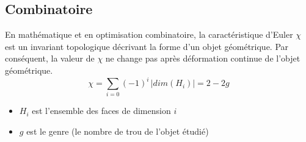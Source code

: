 \subsection{Combinatoire}
\noindent
En mathématique et en optimisation combinatoire, la caractéristique d'Euler $\chi$ est un invariant topologique décrivant la forme d'un objet géométrique. Par conséquent, la valeur de $\chi$ ne change pas après déformation continue de l'objet géométrique.
\begin{equation}
\chi = \sum_{i=0} (-1)^i \, |dim(H_i)| = 2-2g
\end{equation}
\begin{itemize}
\item $H_i$ est l'ensemble des faces de dimension $i$
\item $g$ est le genre (le nombre de trou de l'objet étudié)\\ 
\end{itemize}

